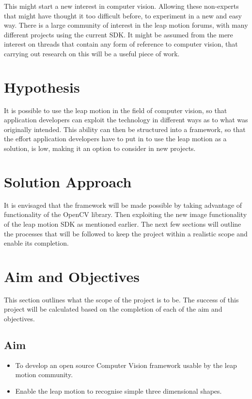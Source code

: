 \documentclass[11pt,oneside]{report}
\begin{document}
				This might start a new interest in computer vision.
				Allowing these non-experts that might have thought it too difficult before, to experiment in a new and easy way.
				There is a large community of interest in the leap motion forums, with many different projects using the current SDK.
				It might be assumed from the mere interest on threads that contain any form of reference to computer vision, that carrying out research on this will be a useful piece of work.
		\section{Hypothesis}
				It is possible to use the leap motion in the field of computer vision, so that application developers can exploit the technology in different ways as to what was originally intended.	
				This ability can then be structured into a framework, so that the effort application developers have to put in to use the leap motion as a solution, is low, making it an option to consider in new projects.	
		\section{Solution Approach}	
			It is envisaged that the framework will be made possible by taking advantage of functionality of the OpenCV library.
			Then exploiting the new image functionality of the leap motion SDK as mentioned earlier.
			The next few sections will outline the processes that will be followed to keep the project within a realistic scope and enable its completion.
					
		\section{Aim and Objectives} 
		This section outlines what the scope of the project is to be.
		The success of this project will be calculated based on the completion of each of the aim and objectives.
		\subsection{Aim}
		\begin{itemize}
			\item To develop an open source Computer Vision framework usable by the leap motion community.
			\item Enable the leap motion to recognise simple three dimensional shapes.
		\end{itemize}
\end{document}
